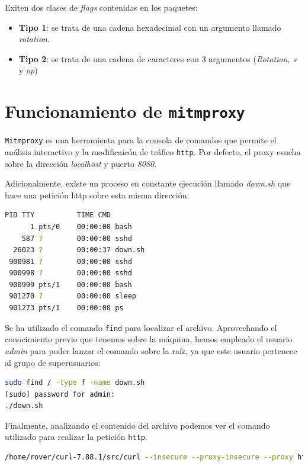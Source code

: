 \documentclass[]{article}
\begin{document}
Exiten dos clases de \textit{flags} contenidas en los paquetes:
\begin{itemize}
    \item \textbf{Tipo 1}: se trata de una cadena hexadecimal con un argumento
    llamado \textit{rotation}.
    \item \textbf{Tipo 2}: se trata de una cadena de caracteres con 3
    argumentos (\textit{Rotation, s} y \textit{op})
\end{itemize}

\section{Funcionamiento de \texttt{mitmproxy}}
\label{sec:proxy}

\texttt{Mitmproxy} es una herramienta para la consola de comandos que permite
el análisis interactivo y la modificaicón de tráfico \texttt{http}. Por
defecto, el proxy esucha sobre la dirección \textit{localhost} y puerto
\textit{8080}.

Adicionalmente, existe un proceso en constante ejecución llamado
\textit{down.sh} que hace una petición http sobre esta misma dirección.

\begin{lstlisting}[language=bash, caption=Resultado de ejecutar ps -e]
   PID TTY          TIME CMD
      1 pts/0    00:00:00 bash
    587 ?        00:00:00 sshd
  26023 ?        00:00:37 down.sh
 900981 ?        00:00:00 sshd
 900998 ?        00:00:00 sshd
 900999 pts/1    00:00:00 bash
 901270 ?        00:00:00 sleep
 901273 pts/1    00:00:00 ps
\end{lstlisting}

Se ha utilizado el comando \texttt{find} para localizar el archivo. Aprovechando el conocimiento previo que tenemos sobre la máquina, hemos empleado el usuario \textit{admin} para poder lanzar el comando sobre la raíz, ya que este usuario pertenece al grupo de superusuarios: 

\begin{lstlisting}[language=bash, caption=Resultado de ejecutar find]
sudo find / -type f -name down.sh
[sudo] password for admin:
./down.sh
\end{lstlisting}

Finalmente, analizando el contenido del archivo podemos ver el comando
utilizado para realizar la petición \texttt{http}.
\begin{lstlisting}[language=bash, caption=petición http a través del comando curl]
    /home/rover/curl-7.88.1/src/curl --insecure --proxy-insecure --proxy https://172.17.0.19:8080 https://172.17.0.4:4443/
\end{lstlisting}
\end{document}
